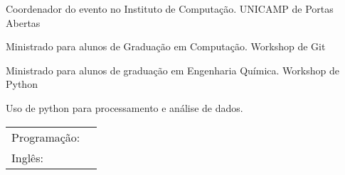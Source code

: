 \documentclass[]{awesome-cv}
\begin{document}
\begin{multicols*}{2}
\begin{cventries}
	\cventry
	{Coordenador do evento no Instituto de Computação.}
	{UNICAMP de Portas Abertas}
	{}
	{}
	{}

	\vspace{-5mm}
	\cventry
	{Ministrado para alunos de Graduação em Computação.}
	{Workshop de Git}
	{}
	{}
	{}

	\vspace{-5mm}
	\cventry
	{Ministrado para alunos de graduação em Engenharia Química.}
	{Workshop de Python}
	{}
	{}
	{\begin{cvitems}
		\item {Uso de python para processamento e análise de dados.}
		\end{cvitems}}

	\vspace{-5mm}
\end{cventries}
\begin{cventries}
	\cventry
	{}
	{\def\arraystretch{1.15}{\begin{tabular}{ l l }
		Programação:  & {\skill{ Python, C/C++}} \\
		Inglês:  & {\skill{ Conversação, escrita e leitura fluentes}} \\
		\end{tabular}}}
	{}
	{}
	{}
  \end{cventries}
\end{multicols*}
\
\end{document}
